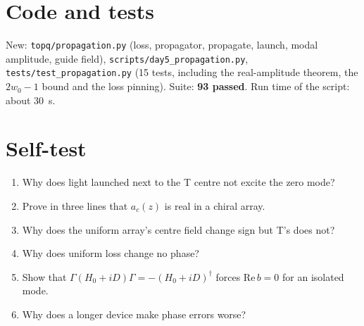 \documentclass[10pt,a4paper]{article}
\begin{document}
\section{Code and tests}
New: \texttt{topq/propagation.py} (loss, propagator, propagate, launch, modal amplitude, guide field), \texttt{scripts/day5\_propagation.py}, \texttt{tests/test\_propagation.py} (15 tests, including the real-amplitude theorem, the $2w_0-1$ bound and the loss pinning). Suite: \textbf{93 passed}. Run time of the script: about 30~s.

\section{Self-test}
\begin{enumerate}[itemsep=1pt]
\item Why does light launched next to the T centre not excite the zero mode?
\item Prove in three lines that $a_c(z)$ is real in a chiral array.
\item Why does the uniform array's centre field change sign but T's does not?
\item Why does uniform loss change no phase?
\item Show that $\Gamma(H_0+iD)\Gamma=-(H_0+iD)^\dagger$ forces $\mathrm{Re}\,b=0$ for an isolated mode.
\item Why does a longer device make phase errors worse?
\end{enumerate}
\end{document}
